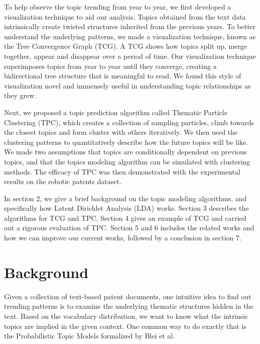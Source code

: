 \documentclass[conference]{IEEEtran}
\begin{document}
To help observe the topic trending from year to year, we first developed a visualization technique to aid our analysis. Topics obtained from the text data intrinsically create twisted structures inherited from the previous years. To better understand the underlying patterns, we made a visualization technique, known as the Tree Convergence Graph (TCG). A TCG shows how topics split up, merge together, appear and disappear over a period of time. Our visualization technique superimposes topics from year to year until they converge, creating a bidirectional tree structure that is meaningful to read. We found this style of visualization novel and immensely useful in understanding topic relationships as they grew. 


Next, we proposed a topic prediction algorithm called Thematic Particle Clustering (TPC), which creates a collection of sampling particles, climb towards the closest topics and form cluster with others iteratively. We then used the clustering patterns to quantitatively describe how the future topics will be like. We made two assumptions that topics are conditionally dependent on previous topics, and that the topics modeling algorithm can be simulated with clustering methods. The efficacy of TPC was then demonstrated with the experimental results on the robotic patents dataset.

In section 2, we give a brief background on the topic modeling algorithms, and specifically how Latent Dirichlet Analysis (LDA) works.  Section 3 describes the algorithms for TCG and TPC. Section 4 gives an example of TCG and carried out a rigorous evaluation of TPC. Section 5 and 6 includes the related works and how we can improve our current works, followed by a conclusion in section 7.

\section{Background}

Given a collection of text-based patent documents, one intuitive idea to find out trending patterns is to examine the underlying thematic structures hidden in the text. Based on the vocabulary distribution, we want to know what the intrinsic topics are implied in the given context. One common way to do exactly that is the Probabilistic Topic Models formalized by  Blei et al. \cite{blei2011}
\end{document}
